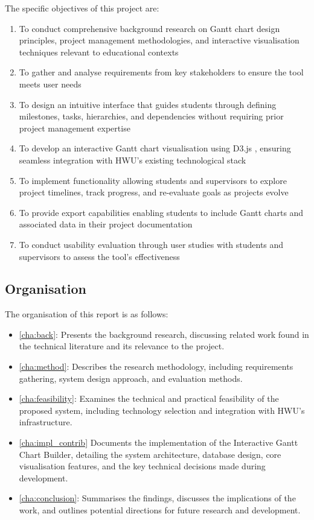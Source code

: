 \documentclass[12pt,nonacm,acmlarge,titlepage,screen]{acmart}
\begin{document}
The specific objectives of this project are:
\begin{enumerate}
    \item To conduct comprehensive background research on Gantt chart design principles, project management methodologies, and interactive visualisation techniques relevant to educational contexts
    \item To gather and analyse requirements from key stakeholders to ensure the tool meets user needs
    \item To design an intuitive interface that guides students through defining milestones, tasks, hierarchies, and dependencies without requiring prior project management expertise
    \item To develop an interactive Gantt chart visualisation using D3.js \cite{geeksforgeeks_d3js_2025, w3schools_d3js_2025}, ensuring seamless integration with HWU's existing technological stack
    \item To implement functionality allowing students and supervisors to explore project timelines, track progress, and re-evaluate goals as projects evolve
    \item To provide export capabilities enabling students to include Gantt charts and associated data in their project documentation
    \item To conduct usability evaluation through user studies with students and supervisors to assess the tool's effectiveness
\end{enumerate}


\subsection{Organisation} \label{sec:intro_orga}
The organisation of this report is as follows:
\begin{itemize}
    \item \cref{cha:back}: Presents the background research, discussing related work found in the technical literature and its relevance to the project.
    \item \cref{cha:method}: Describes the research methodology, including requirements gathering, system design approach, and evaluation methods.
    \item \cref{cha:feasibility}: Examines the technical and practical feasibility of the proposed system, including technology selection and integration with HWU's infrastructure.
    \item \cref{cha:impl_contrib} Documents the implementation of the Interactive Gantt Chart Builder, detailing the system architecture, database design, core visualisation features, and the key technical decisions made during development.
    \item \cref{cha:conclusion}: Summarises the findings, discusses the implications of the work, and outlines potential directions for future research and development.
\end{itemize}
\end{document}
